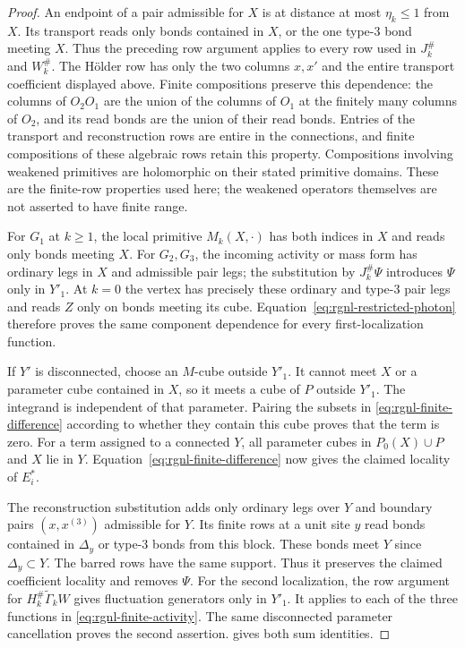 \begin{proof}
An endpoint of a pair admissible for $X$ is at distance
at most $\eta_k\le1$ from $X$. Its transport reads only
bonds contained in $X$, or the one type-$3$ bond meeting $X$.
Thus the preceding row argument applies to every row
used in $J_k^\#$ and $W_k^\#$.
The H\"older row has only the two columns $x,x'$ and
the entire transport coefficient displayed above.
Finite compositions preserve this dependence: the columns
of $O_2O_1$ are the union of the columns of $O_1$ at the
finitely many columns of $O_2$, and its read bonds are the
union of their read bonds. Entries of the transport and
reconstruction rows are entire in the connections, and finite
compositions of these algebraic rows retain this property.
Compositions involving weakened primitives are holomorphic
on their stated primitive domains. These are the finite-row
properties used here; the weakened operators themselves
are not asserted to have finite range.

For $G_1$ at $k\ge1$, the local primitive $M_k(X,\cdot)$
has both indices in $X$ and reads only bonds meeting $X$.
For $G_2,G_3$, the incoming activity or mass form has ordinary
legs in $X$ and admissible pair legs; the substitution by
$J_k^\#\Psi$ introduces $\Psi$ only in $Y'_1$.
At $k=0$ the vertex has precisely these ordinary and
type-$3$ pair legs and reads $Z$ only on bonds meeting
its cube. Equation~\eqref{eq:rgnl-restricted-photon}
therefore proves the same component dependence for every
first-localization function.

If $Y'$ is disconnected, choose an $M$-cube outside $Y'_1$.
It cannot meet $X$ or a parameter cube contained in $X$,
so it meets a cube of $P$ outside $Y'_1$. The integrand is
independent of that parameter. Pairing the subsets in
\eqref{eq:rgnl-finite-difference} according to whether they
contain this cube proves that the term is zero.
For a term assigned to a connected $Y$, all parameter cubes
in $P_0(X)\cup P$ and $X$ lie in $Y$.
Equation~\eqref{eq:rgnl-finite-difference} now gives the
claimed locality of $E_i^*$.

The reconstruction substitution adds only ordinary legs
over $Y$ and boundary pairs $(x,x^{(3)})$ admissible for
$Y$. Its finite rows at a unit site $y$ read bonds contained
in $\Delta_y$ or type-$3$ bonds from this block. These bonds
meet $Y$ since $\Delta_y\subset Y$. The barred rows have
the same support. Thus it preserves the claimed coefficient
locality and removes $\Psi$.
For the second localization, the row argument for
$H_k^\#\widetilde\Gamma_kW$ gives fluctuation generators
only in $Y'_1$. It applies to each of the three functions
in \eqref{eq:rgnl-finite-activity}. The same disconnected
parameter cancellation proves the second assertion.
 gives both sum identities.


\end{proof}
